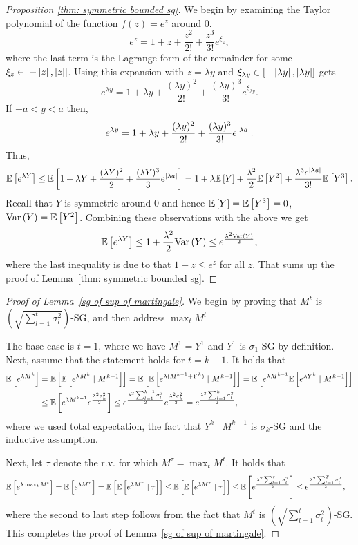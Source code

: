 \begin{proof}[Proposition \ref{thm: symmetric bounded sg}]
    We begin by examining the Taylor polynomial of the function $f(z)=e^z$ around $0$.
    \[
    e^z=  1 + z + \frac{z^2}{2!} + \frac{z^3}{3!} e^{\xi_z},
    \]
    where the last term is the  Lagrange form of the remainder for some $\xi_z \in [-\left\lvert z\right\rvert, \left\lvert z\right\rvert]$.
    Using this expansion with $z=\lambda y$ and $\xi_{\lambda y} \in [-\left\lvert\lambda y\right\rvert, \left\lvert\lambda y\right\rvert]$ gets
    \[
    e^{\lambda y} = 1 + \lambda y + \frac{(\lambda y)^2}{2!} + \frac{(\lambda y)^3}{3!} e^{\xi_{\lambda y}}.
    \]
    If $-a<y<a$ then,
    \[
    e^{\lambda y} = 1 + \lambda y + \frac{(\lambda y)^2}{2!} + \frac{(\lambda y)^3}{3!} e^{\left\lvert\lambda a\right\rvert}.
    \]
    Thus,
    \[
    \mathbb{E}\left[ e^{\lambda Y} \right] \leq \mathbb{E}\left[ 1 + \lambda Y + \frac{(\lambda Y)^2}{2} + \frac{(\lambda Y)^3}{3} e^{|\lambda a|} \right] = 
    1 + \lambda \mathbb{E}\left[ Y \right] + \frac{\lambda^2}{2}\mathbb{E}\left[ Y^2 \right] +\frac{\lambda^3 e^{|\lambda a|}}{3!} \mathbb{E}\left[ Y^3 \right].
    \]
    Recall that $Y$ is symmetric around $0$ and hence $\mathbb{E}\left[ Y \right] = \mathbb{E}\left[ Y^3 \right] = 0$, $\mathrm{Var}\left( Y \right) = \mathbb{E}\left[ Y^2 \right]$.
    Combining these observations with the above we get
    \[
    \mathbb{E}\left[ e^{\lambda Y} \right] \leq 1 + \frac{\lambda^2}{2}\mathrm{Var}\left( Y \right) \leq e^{\frac{\lambda^2 \mathrm{Var}\left( Y \right)}{2}},
    \]
    where the last inequality is due to that $1+z \leq e^z$ for all $z$.
    That sums up the proof of Lemma~\ref{thm: symmetric bounded sg}.
\end{proof}




\begin{proof}[Proof of Lemma~\ref{sg of sup of martingale}]
We begin by proving that $M^t$ is $\left(\sqrt{\sum_{l=1}^t \sigma_l^2}\right)$-SG, and then address $\max_t M^t$


The base case is $t=1$, where we have $M^1=Y^1$ and $Y^1$ is $\sigma_1$-SG by definition. Next, assume that the statement holds for $t=k-1$. It holds that 
\begin{align*}
\mathbb{E}\left[ e^{\lambda M^{k}} \right]&=\mathbb{E}\left[ \mathbb{E}\left[ e^{\lambda M^{k}}\mid M^{k-1} \right] \right]=\mathbb{E}\left[ \mathbb{E}\left[ e^{\lambda (M^{k-1}+Y^k)}\mid M^{k-1} \right] \right] = \mathbb{E}\left[ e^{\lambda M^{k-1}} \mathbb{E}\left[ e^{\lambda Y^k}\mid M^{k-1} \right] \right]\\
& \leq \mathbb{E}\left[ e^{\lambda M^{k-1}} e^{\frac{\lambda^2 \sigma_k^2}{2}} \right] \leq e^{\frac{\lambda^2 \sum_{l=1}^{k-1} \sigma_l^2}{2} }e^{\frac{\lambda^2 \sigma_k^2}{2}} = e^{\frac{\lambda^2 \sum_{l=1}^{k} \sigma_l^2}{2} },
\end{align*}
where we used total expectation, the fact that $Y^k\mid M^{k-1}$ is $\sigma_k$-SG and the inductive assumption.

Next, let $\tau$ denote the r.v. for which $M^\tau = \max_t M^t$. It holds that
\begin{align*}
    \mathbb{E}\left[ e^{\lambda \max_t M^t} \right] &= \mathbb{E}\left[ e^{\lambda M^\tau} \right] = \mathbb{E}\left[ \mathbb{E}\left[ e^{\lambda M^\tau} \mid \tau \right] \right] \leq \mathbb{E}\left[ \mathbb{E}\left[ e^{\lambda M^\tau} \mid \tau \right] \right] \leq \mathbb{E}\left[ e^{\frac{\lambda^2 \sum_{l=1}^{\tau} \sigma_l^2}{2} } \right] \leq e^{\frac{\lambda^2 \sum_{l=1}^{T} \sigma_l^2}{2} },
\end{align*}
where the second to last step follows from the fact that $M^t$ is $\left(\sqrt{\sum_{l=1}^t \sigma_l^2}\right)$-SG. This completes the proof of Lemma~\ref{sg of sup of martingale}.
\end{proof}

